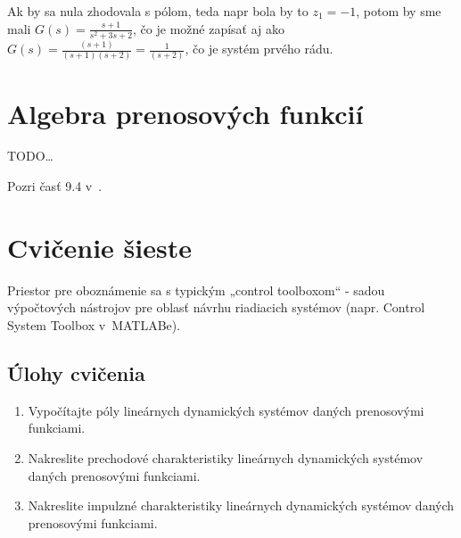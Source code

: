 \documentclass[a4paper, 10pt, ]{article}
\begin{document}
\begin{center}


	\label{PCHSS2R_B}

\end{center}

\begin{center}


	\label{ICHSS2R_B}

\end{center}

Ak by sa nula zhodovala s pólom, teda napr bola by to $z_1 = -1$, potom by sme mali $G(s) =  \frac{s + 1}{s^2 + 3 s + 2}$, čo je možné zapísať aj ako $G(s) =  \frac{(s + 1)}{(s+1)(s+2)} =  \frac{1}{(s+2)}$, čo je systém prvého rádu.










\pagebreak

\section{Algebra prenosových funkcií}

TODO\ldots

\medskip

\noindent
Pozri časť 9.4 v~\cite{AsM08se}.

\section{Cvičenie šieste}

Priestor pre oboznámenie sa s typickým „control toolboxom“ - sadou výpočtových nástrojov pre oblasť návrhu riadiacich systémov (napr. Control System Toolbox v~MATLABe).

\subsection{Úlohy cvičenia}

\begin{enumerate}[leftmargin=0pt, labelsep=4mm, itemsep=0pt]

	\item Vypočítajte póly lineárnych dynamických systémov daných prenosovými funkciami.

	\item Nakreslite prechodové charakteristiky lineárnych dynamických systémov daných prenosovými funkciami.

	\item Nakreslite impulzné charakteristiky lineárnych dynamických systémov daných prenosovými funkciami.

\end{enumerate}
\end{document}
